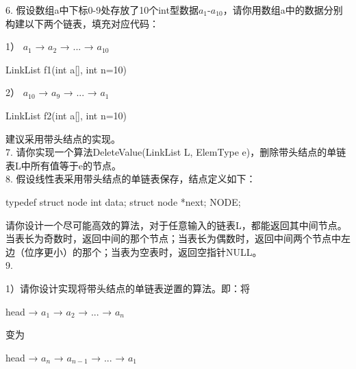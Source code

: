 6. 假设数组a中下标0-9处存放了10个int型数据\(a_1\)-\(a_{10}\)，请你用数组a中的数据分别构建以下两个链表，填充对应代码：

1） \(a_1\) → \(a_2\) → ... → \(a_{10}\)
\begin{cppcode}
    LinkList f1(int a[], int n=10) {

    }
\end{cppcode}
2） \(a_{10}\) → \(a_9\) → ... → \(a_1\)
\begin{cppcode}
    LinkList f2(int a[], int n=10) {

    }
\end{cppcode}
建议采用带头结点的实现。\\

7. 请你实现一个算法DeleteValue(LinkList L, ElemType e)，删除带头结点的单链表L中所有值等于e的节点。\\





8. 假设线性表采用带头结点的单链表保存，结点定义如下：
\begin{cppcode}
    typedef struct node
    {
        int data;
        struct node *next;
    }NODE;
\end{cppcode}
请你设计一个尽可能高效的算法，对于任意输入的链表L，都能返回其中间节点。
当表长为奇数时，返回中间的那个节点；当表长为偶数时，返回中间两个节点中左边（位序更小）的那个；当表为空表时，返回空指针NULL。\\

9.

1）请你设计实现将带头结点的单链表逆置的算法。即：将
\begin{bulk}
    \begin{center}
        head → \(a_1\) → \(a_2\) → ... → \(a_n\)
    \end{center}
\end{bulk}
变为
\begin{bulk}
    \begin{center}
        head → \(a_n\) → \(a_{n-1}\) → ... → \(a_1\)
    \end{center}
\end{bulk}

